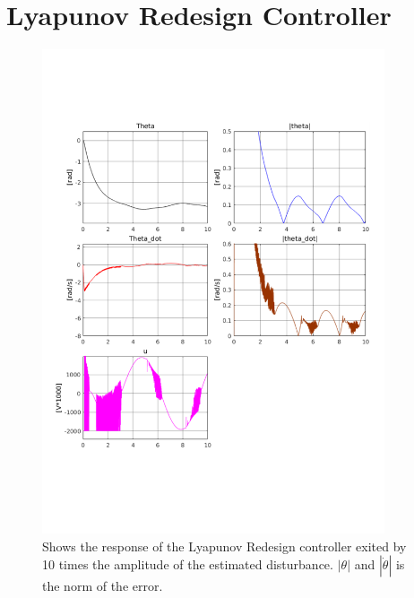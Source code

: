 \section{Lyapunov Redesign Controller} %
\label{sec:lyapunov_redesign_controller}
\begin{figure}[H]
        \centering
        \includegraphics[width=0.9\textwidth,trim=0.5cm 5cm 0.5cm 4cm, clip]{lyap_extreme_dis.pdf}
        \caption{Shows the response of the Lyapunov Redesign controller exited by 10 times the amplitude of the estimated disturbance. $|\theta|$ and $|\dot{\theta}|$ is the norm of the error.}
        \label{fig:lyap_extreme}
\end{figure}


